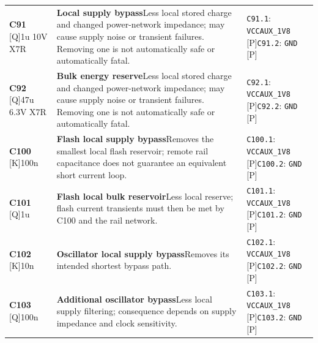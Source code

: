 \documentclass[11pt,a4paper]{article}
\begin{document}
\begin{longtable}{@{}P{27mm}P{77mm}P{62mm}@{}}
\textbf{C91} [Q]\newline 1u 10V X7R & \textbf{Local supply bypass}\newline Less local stored charge and changed power-network impedance; may cause supply noise or transient failures. Removing one is not automatically safe or automatically fatal. & \nolinkurl{C91.1}: \nolinkurl{VCCAUX_1V8} [P]\newline \nolinkurl{C91.2}: \nolinkurl{GND} [P] \\
\textbf{C92} [Q]\newline 47u 6.3V X7R & \textbf{Bulk energy reserve}\newline Less local stored charge and changed power-network impedance; may cause supply noise or transient failures. Removing one is not automatically safe or automatically fatal. & \nolinkurl{C92.1}: \nolinkurl{VCCAUX_1V8} [P]\newline \nolinkurl{C92.2}: \nolinkurl{GND} [P] \\
\textbf{C100} [K]\newline 100n & \textbf{Flash local supply bypass}\newline Removes the smallest local flash reservoir; remote rail capacitance does not guarantee an equivalent short current loop. & \nolinkurl{C100.1}: \nolinkurl{VCCAUX_1V8} [P]\newline \nolinkurl{C100.2}: \nolinkurl{GND} [P] \\
\textbf{C101} [Q]\newline 1u & \textbf{Flash local bulk reservoir}\newline Less local reserve; flash current transients must then be met by C100 and the rail network. & \nolinkurl{C101.1}: \nolinkurl{VCCAUX_1V8} [P]\newline \nolinkurl{C101.2}: \nolinkurl{GND} [P] \\
\textbf{C102} [K]\newline 10n & \textbf{Oscillator local supply bypass}\newline Removes its intended shortest bypass path. & \nolinkurl{C102.1}: \nolinkurl{VCCAUX_1V8} [P]\newline \nolinkurl{C102.2}: \nolinkurl{GND} [P] \\
\textbf{C103} [Q]\newline 100n & \textbf{Additional oscillator bypass}\newline Less local supply filtering; consequence depends on supply impedance and clock sensitivity. & \nolinkurl{C103.1}: \nolinkurl{VCCAUX_1V8} [P]\newline \nolinkurl{C103.2}: \nolinkurl{GND} [P] \\

\end{longtable}
\end{document}
